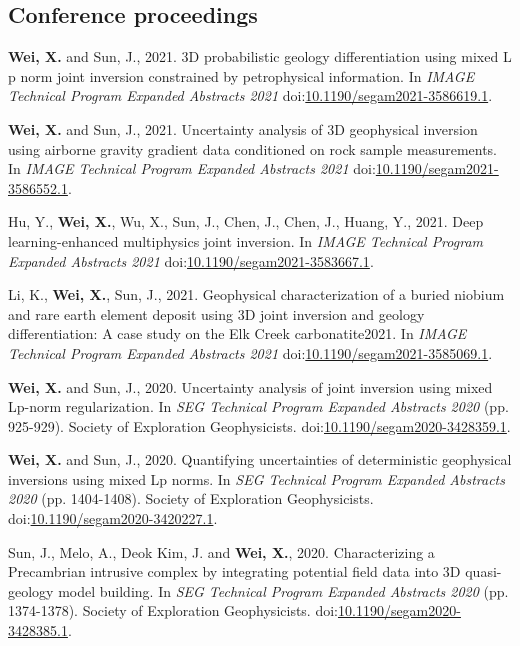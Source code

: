 \documentclass[11pt, a4paper]{article}
\newcommand{\LastName}{Wei}
\newcommand{\Initials}{X}
\newcommand{\Wei}{\textbf{\LastName, \Initials.}}  %
\newcommand{\WeiSun}{\textbf{\LastName, \Initials.} and Sun, J.}  %
\newcommand{\DOI}[1]{doi:\href{https://doi.org/#1}{#1}}
\begin{document}
\subsection*{Conference proceedings}
\begin{etaremune}

	\item
	\WeiSun, 2021. 3D probabilistic geology differentiation using mixed L p norm joint inversion constrained by petrophysical information. In \emph{IMAGE Technical Program Expanded Abstracts 2021} \DOI{10.1190/segam2021-3586619.1}.

	\item
	\WeiSun, 2021. Uncertainty analysis of 3D geophysical inversion using airborne gravity gradient data conditioned on rock sample measurements. In \emph{IMAGE Technical Program Expanded Abstracts 2021} \DOI{10.1190/segam2021-3586552.1}.

	\item
	Hu, Y., \Wei, Wu, X., Sun, J., Chen, J., Chen, J., Huang, Y., 2021. Deep learning-enhanced multiphysics joint inversion. In \emph{IMAGE Technical Program Expanded Abstracts 2021} \DOI{10.1190/segam2021-3583667.1}.

	\item
	Li, K., \Wei, Sun, J., 2021. Geophysical characterization of a buried niobium and rare earth element deposit using 3D joint inversion and geology differentiation: A case study on the Elk Creek carbonatite2021. In \emph{IMAGE Technical Program Expanded Abstracts 2021} \DOI{10.1190/segam2021-3585069.1}.

	\item
	\WeiSun, 2020. Uncertainty analysis of joint inversion using mixed Lp-norm regularization. In \emph{SEG Technical Program Expanded Abstracts 2020} (pp. 925-929). Society of Exploration Geophysicists. \DOI{10.1190/segam2020-3428359.1}.

	\item
	\WeiSun, 2020. Quantifying uncertainties of deterministic geophysical inversions using mixed Lp norms. In \emph{SEG Technical Program Expanded Abstracts 2020} (pp. 1404-1408). Society of Exploration Geophysicists. \DOI{10.1190/segam2020-3420227.1}.

	\item
	Sun, J., Melo, A., Deok Kim, J. and \Wei, 2020. Characterizing a Precambrian intrusive complex by integrating potential field data into 3D quasi-geology model building. In \emph{SEG Technical Program Expanded Abstracts 2020} (pp. 1374-1378). Society of Exploration Geophysicists. \DOI{10.1190/segam2020-3428385.1}.

\end{etaremune}
\end{document}
